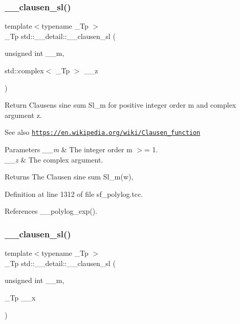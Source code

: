 \subsubsection{\texorpdfstring{\+\_\+\+\_\+clausen\+\_\+sl()}{\_\_clausen\_sl()}\hspace{0.1cm}{\footnotesize\ttfamily [1/2]}}
{\footnotesize\ttfamily template$<$typename \+\_\+\+Tp $>$ \\
\+\_\+\+Tp std\+::\+\_\+\+\_\+detail\+::\+\_\+\+\_\+clausen\+\_\+sl (\begin{DoxyParamCaption}\item[{unsigned int}]{\+\_\+\+\_\+m,  }\item[{std\+::complex$<$ \+\_\+\+Tp $>$}]{\+\_\+\+\_\+z }\end{DoxyParamCaption})}

Return Clausen\textquotesingle{}s sine sum Sl\+\_\+m for positive integer order m and complex argument z. \begin{DoxySeeAlso}{See also}
\href{https://en.wikipedia.org/wiki/Clausen_function}{\tt https\+://en.\+wikipedia.\+org/wiki/\+Clausen\+\_\+function}
\end{DoxySeeAlso}

\begin{DoxyParams}{Parameters}
{\em \+\_\+\+\_\+m} & The integer order m $>$= 1. \\
\hline
{\em \+\_\+\+\_\+z} & The complex argument. \\
\hline
\end{DoxyParams}
\begin{DoxyReturn}{Returns}
The Clausen sine sum Sl\+\_\+m(w), 
\end{DoxyReturn}


Definition at line 1312 of file sf\+\_\+polylog.\+tcc.



References \+\_\+\+\_\+polylog\+\_\+exp().

\mbox{\label{namespacestd_1_1____detail_a554bb352d6397ea5991400eb3734165f}} 
\subsubsection{\texorpdfstring{\+\_\+\+\_\+clausen\+\_\+sl()}{\_\_clausen\_sl()}\hspace{0.1cm}{\footnotesize\ttfamily [2/2]}}
{\footnotesize\ttfamily template$<$typename \+\_\+\+Tp $>$ \\
\+\_\+\+Tp std\+::\+\_\+\+\_\+detail\+::\+\_\+\+\_\+clausen\+\_\+sl (\begin{DoxyParamCaption}\item[{unsigned int}]{\+\_\+\+\_\+m,  }\item[{\+\_\+\+Tp}]{\+\_\+\+\_\+x }\end{DoxyParamCaption})}

